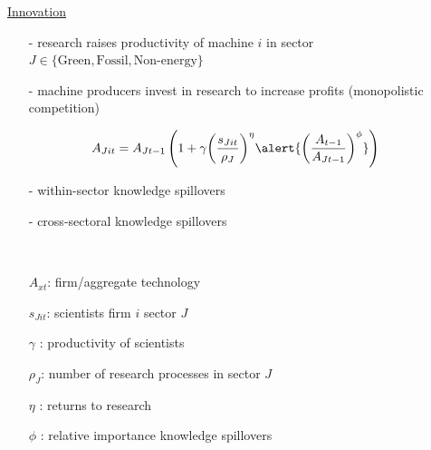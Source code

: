\documentclass[11pt,aspectratio=169]{beamer}
\begin{document}
\addtocounter{framenumber}{-1}
\begin{frame}{\hyperlink{modma}{Innovation}}
	\vspace{-2mm}
	\begin{itemize}
		\item[-] research raises productivity of machine $i$ in sector $J\in\{\text{Green},\text{Fossil},\text{Non-energy}\}$ \vspace{-1mm}
		\item[-] machine producers invest in research to increase profits \small{(monopolistic competition)}
		\vspace{-1mm}
		\normalsize
	\end{itemize}
	\vspace{-1.4mm}
	\large
	\begin{align*}
		A_{Jit}={A_{Jt-1}}\left(1+\gamma{\left(\frac{s_{Jit}}{\rho_J}\right)^{\eta}}\alert{\left(\frac{A_{t-1}}{A_{Jt-1}}\right)^\phi}\right)
	\end{align*}
	\normalsize
	\vspace{-1.9mm}
	\begin{enumerate}
		\item[-] within-sector knowledge spillovers \vspace{-1mm}
		\item[-]  \alert{cross-sectoral knowledge spillovers} \vspace{-1mm}%
		\item[] \
	\end{enumerate}
	\small
\vspace{4mm}
\hspace{-2mm}
\begin{minipage}[t!]{0.43\textwidth}
	\vspace{0mm}
	\begin{itemize}
		\item[] $A_{xt}$: firm/aggregate technology
		\vspace{-2mm}		
		\item[] $s_{Jit}$: scientists firm $i$ sector $J$
		\vspace{-2mm}
		\item[] $\gamma$ : productivity of scientists
	\end{itemize}
\end{minipage}
\vspace{-5mm}
\begin{minipage}[t!]{0.55\textwidth}
	\vspace{0mm}
	\begin{itemize}	
		\item[] {$\rho_J$: number of research processes in sector $J$}
		\vspace{-2mm}			
		\item[] $\eta$ : returns to research
		\vspace{-2mm}			
		\item[] $\phi$ : relative importance knowledge spillovers
	\end{itemize}
\end{minipage}
\end{frame}
\end{document}
